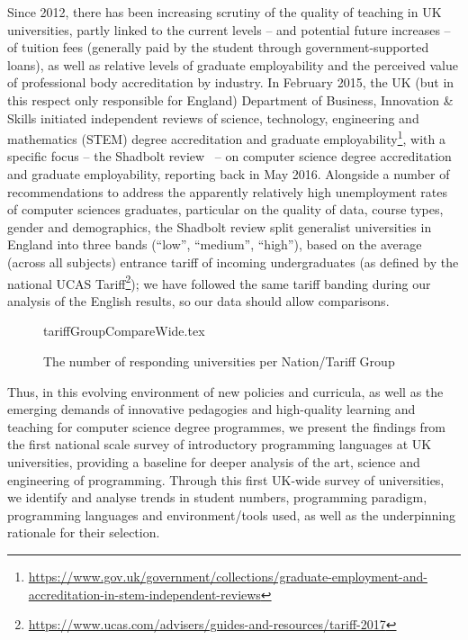 \documentclass[english]{programming}
\begin{document}
Since 2012, there has been increasing scrutiny of the quality of
teaching in UK universities, partly linked to the current levels --
and potential future increases -- of tuition fees (generally paid by
the student through government-supported loans), as well as relative
levels of graduate employability and the perceived value of
professional body accreditation by industry. In February 2015, the UK
(but in this respect only responsible for England) Department of
Business, Innovation \& Skills initiated independent reviews of
science, technology, engineering and mathematics (STEM) degree
accreditation and graduate
employability\footnote{\url{https://www.gov.uk/government/collections/graduate-employment-and-accreditation-in-stem-independent-reviews}},
with a specific focus -- the Shadbolt review~\cite{shadbolt:2016} --
on computer science degree accreditation and graduate employability,
reporting back in May 2016. Alongside a number of recommendations to
address the apparently relatively high unemployment rates of computer
sciences graduates, particular on the quality of data, course types,
gender and demographics, the Shadbolt review split generalist
universities in England into three bands (``low'', ``medium'',
``high''), based on the average (across all subjects) entrance tariff
of incoming undergraduates (as defined by the national UCAS
Tariff\footnote{\url{https://www.ucas.com/advisers/guides-and-resources/tariff-2017}});
we have followed the same tariff banding during our analysis of the
English results, so our data should allow comparisons.

\begin{figure}
\begin{center}
{tariffGroupCompareWide.tex}
\caption{The number of responding universities per Nation/Tariff Group\label{fig:TG}}
\end{center}
\end{figure}

Thus, in this evolving environment of new policies and curricula, as
well as the emerging demands of innovative pedagogies and high-quality
learning and teaching for computer science degree programmes, we
present the findings from the first national scale survey of
introductory programming languages at UK universities, providing a
baseline for deeper analysis of the art, science and engineering of
programming. Through this first UK-wide survey of universities, we
identify and analyse trends in student numbers, programming paradigm,
programming languages and environment/tools used, as well as the
underpinning rationale for their selection.
\end{document}
